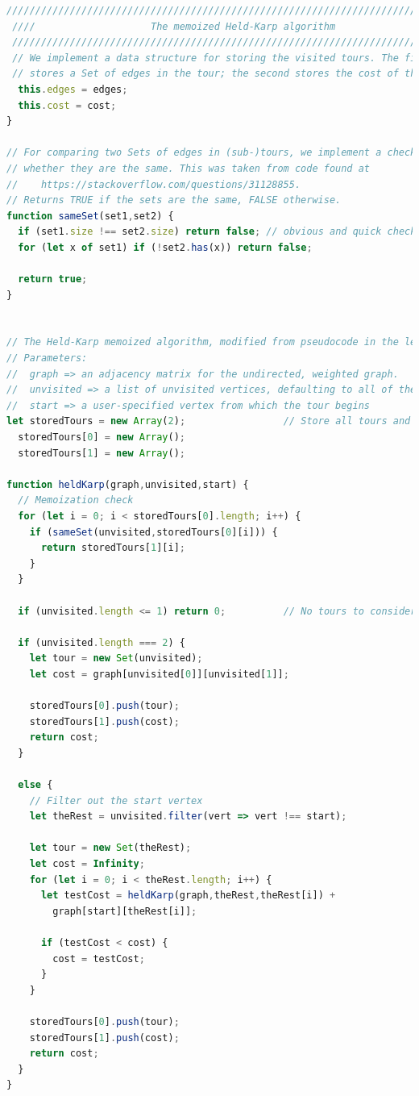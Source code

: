 \documentclass[10pt]{extarticle}
\begin{document}
 \begin{lstlisting}[language=JavaScript]
 ///////////////////////////////////////////////////////////////////////////////
 ////                    The memoized Held-Karp algorithm                   ////
 ///////////////////////////////////////////////////////////////////////////////  
 // We implement a data structure for storing the visited tours. The first entry 
 // stores a Set of edges in the tour; the second stores the cost of the tour. function StoreTours(edges,cost) {
  this.edges = edges;
  this.cost = cost;
}

// For comparing two Sets of edges in (sub-)tours, we implement a check to see
// whether they are the same. This was taken from code found at
//    https://stackoverflow.com/questions/31128855.
// Returns TRUE if the sets are the same, FALSE otherwise.
function sameSet(set1,set2) {
  if (set1.size !== set2.size) return false; // obvious and quick check
  for (let x of set1) if (!set2.has(x)) return false;

  return true;
}


// The Held-Karp memoized algorithm, modified from pseudocode in the lectures.
// Parameters:
//  graph => an adjacency matrix for the undirected, weighted graph.
//  unvisited => a list of unvisited vertices, defaulting to all of them
//  start => a user-specified vertex from which the tour begins
let storedTours = new Array(2);                 // Store all tours and sub-tours
  storedTours[0] = new Array();
  storedTours[1] = new Array();

function heldKarp(graph,unvisited,start) {
  // Memoization check
  for (let i = 0; i < storedTours[0].length; i++) {
    if (sameSet(unvisited,storedTours[0][i])) {
      return storedTours[1][i];
    }
  }

  if (unvisited.length <= 1) return 0;          // No tours to consider

  if (unvisited.length === 2) {
    let tour = new Set(unvisited);
    let cost = graph[unvisited[0]][unvisited[1]];

    storedTours[0].push(tour);
    storedTours[1].push(cost);
    return cost;
  } 
  
  else {
    // Filter out the start vertex
    let theRest = unvisited.filter(vert => vert !== start);

    let tour = new Set(theRest);
    let cost = Infinity;
    for (let i = 0; i < theRest.length; i++) {
      let testCost = heldKarp(graph,theRest,theRest[i]) + 
        graph[start][theRest[i]];

      if (testCost < cost) {
        cost = testCost;
      }
    }

    storedTours[0].push(tour);
    storedTours[1].push(cost);
    return cost;
  }
}
\end{lstlisting}
\end{document}
